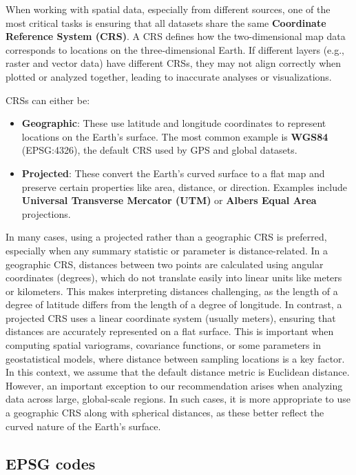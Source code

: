 \documentclass[
  letterpaper,
]{krantz}
\begin{document}
When working with spatial data, especially from different sources, one
of the most critical tasks is ensuring that all datasets share the same
\textbf{Coordinate Reference System (CRS)}. A CRS defines how the
two-dimensional map data corresponds to locations on the
three-dimensional Earth. If different layers (e.g., raster and vector
data) have different CRSs, they may not align correctly when plotted or
analyzed together, leading to inaccurate analyses or visualizations.

CRSs can either be:

\begin{itemize}
\item
  \textbf{Geographic}: These use latitude and longitude coordinates to
  represent locations on the Earth's surface. The most common example is
  \textbf{WGS84} (EPSG:4326), the default CRS used by GPS and global
  datasets.
\item
  \textbf{Projected}: These convert the Earth's curved surface to a flat
  map and preserve certain properties like area, distance, or direction.
  Examples include \textbf{Universal Transverse Mercator (UTM)} or
  \textbf{Albers Equal Area} projections.
\end{itemize}

In many cases, using a projected rather than a geographic CRS is
preferred, especially when any summary statistic or parameter is
distance-related. In a geographic CRS, distances between two points are
calculated using angular coordinates (degrees), which do not translate
easily into linear units like meters or kilometers. This makes
interpreting distances challenging, as the length of a degree of
latitude differs from the length of a degree of longitude. In contrast,
a projected CRS uses a linear coordinate system (usually meters),
ensuring that distances are accurately represented on a flat surface.
This is important when computing spatial variograms, covariance
functions, or some parameters in geostatistical models, where distance
between sampling locations is a key factor. In this context, we assume
that the default distance metric is Euclidean distance. However, an
important exception to our recommendation arises when analyzing data
across large, global-scale regions. In such cases, it is more
appropriate to use a geographic CRS along with spherical distances, as
these better reflect the curved nature of the Earth's surface.

\subsection{EPSG codes}\label{epsg-codes}
\end{document}
